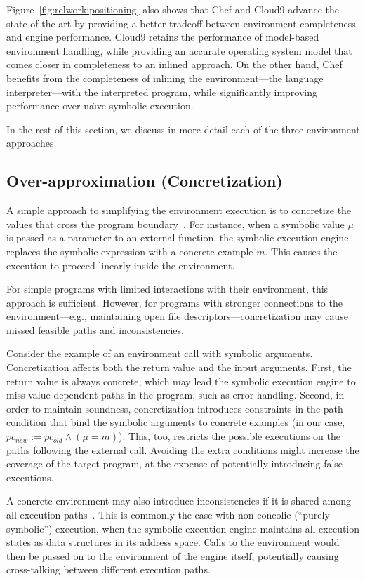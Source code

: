 Figure~\ref{fig:relwork:positioning} also shows that Chef and Cloud9 advance the state of the art by providing a better tradeoff between environment completeness and engine performance.
%
Cloud9 retains the performance of model-based environment handling, while providing an accurate operating system model that comes closer in completeness to an inlined approach.
%
On the other hand, Chef benefits from the completeness of inlining the environment---the language interpreter---with the interpreted program, while significantly improving performance over na\"{\i}ve symbolic execution.

In the rest of this section, we discuss in more detail each of the three environment approaches.

\subsection{Over-approximation (Concretization)}

A simple approach to simplifying the environment execution is to concretize the values that cross the program boundary~\cite{dart,godefroid:fuzz,klee,exe}.
%
For instance, when a symbolic value $\mu$ is passed as a parameter to an external function, the symbolic execution engine replaces the symbolic expression with a concrete example $m$.  This causes the execution to proceed linearly inside the environment.

For simple programs with limited interactions with their environment, this approach is sufficient.  However, for programs with stronger connections to the environment---e.g., maintaining open file descriptors---concretization may cause missed feasible paths and inconsistencies.

Consider the example of an environment call with symbolic arguments.  Concretization affects both the return value and the input arguments.
%
First, the return value is always concrete, which may lead the symbolic execution engine to miss value-dependent paths in the program, such as error handling.
%
Second, in order to maintain soundness, concretization introduces constraints in the path condition that bind the symbolic arguments to concrete examples (in our case, $pc_{new} := pc_{old} \wedge (\mu = m)$).  This, too, restricts the possible executions on the paths following the external call.
%
Avoiding the extra conditions might increase the coverage of the target program, at the expense of potentially introducing false executions.

A concrete environment may also introduce inconsistencies if it is shared among all execution paths~\cite{klee}.
%
This is commonly the case with non-concolic (``purely-symbolic'') execution, when the symbolic execution engine maintains all execution states as data structures in its address space.  Calls to the environment would then be passed on to the environment of the engine itself, potentially causing cross-talking between different execution paths.

